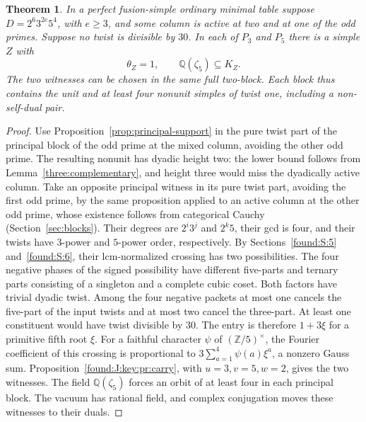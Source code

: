 \documentclass[11pt,a4paper]{article}
\numberwithin{equation}{section}
\newtheorem{theorem}{Theorem}[section]
\theoremstyle{remark}
\newcommand{\ZZ}{\mathbb Z}
\newcommand{\QQ}{\mathbb Q}
\begin{document}
\begin{theorem}\label{found:J:6.3}\label{found:J:key:thm:twistone}
In a perfect fusion-simple ordinary minimal table suppose $D=2^6 3^{2e}5^4$, with $e\ge3$, and some column is active
at two and at one of the odd primes. Suppose no twist is divisible
by $30$. In each of $P_3$ and $P_5$ there is a simple $Z$ with
\[
               \theta_Z=1,\qquad \QQ(\zeta_5)\subseteq K_Z .
\]
The two witnesses can be chosen in the same full two-block.
Each block thus contains the unit and at least four nonunit simples
of twist one, including a non-self-dual pair.
\end{theorem}
\begin{proof}
Use Proposition~\ref{prop:principal-support} in the pure twist part of the principal
block of the odd prime at the mixed column, avoiding the other odd
prime. The resulting nonunit has dyadic height two: the lower bound follows from Lemma~\ref{three:complementary}, and height three would miss the dyadically
active column. Take an opposite principal witness in its pure
twist part, avoiding the first odd prime, by the same proposition applied to an active column at the other odd prime, whose existence follows from categorical Cauchy (Section~\ref{sec:blocks}).
Their degrees are $2^i3^j$ and $2^k5$, their gcd is four, and their
twists have $3$-power and $5$-power order, respectively. By Sections~\ref{found:S:5} and~\ref{found:S:6}, their lcm-normalized crossing has two possibilities.
The four negative phases of the signed possibility have different
five-parts and ternary parts consisting of a singleton and a complete
cubic coset. Both factors have trivial dyadic twist. Among the four
negative packets at most one cancels the five-part of the input
twists and at most two cancel the three-part. At least one constituent
would have twist divisible by $30$. The entry is therefore
$1+3\xi$ for a primitive fifth root $\xi$.
For a faithful character $\psi$ of $(\ZZ/5)^\times$, the
Fourier coefficient of this crossing is proportional to
$3\sum_{a=1}^4\psi(a)\xi^a$, a nonzero Gauss sum.
Proposition~\ref{found:J:key:pr:carry}, with $u=3,v=5,w=2$, gives the
two witnesses. The field $\QQ(\zeta_5)$ forces an orbit of
at least four in each principal block. The vacuum has rational
field, and complex conjugation moves these witnesses to their duals.
\end{proof}
\end{document}
